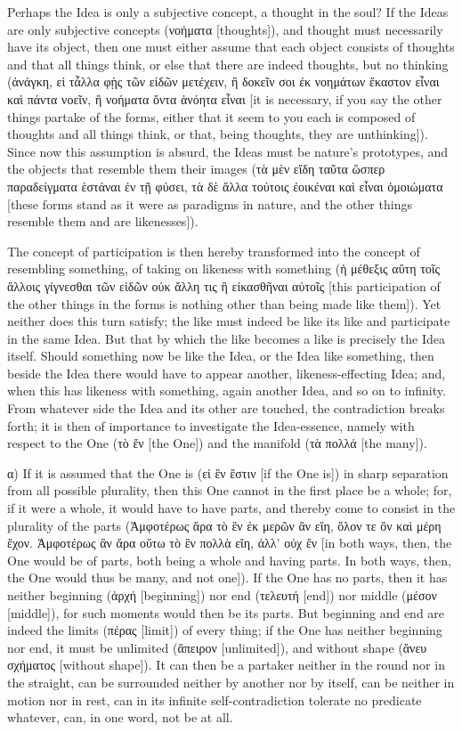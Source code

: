 \documentclass[12pt]{book}
\begin{document}
Perhaps the Idea is only a subjective concept, a thought in the soul? If the Ideas are only
subjective concepts (νοήματα [thoughts]), and thought must necessarily have its object, then one
must either assume that each object consists of thoughts and that all things think, or else that
there are indeed thoughts, but no thinking (ἀνάγκη, εἰ τἆλλα φῂς τῶν εἰδῶν μετέχειν, ἢ δοκεῖν σοι ἐκ
νοημάτων ἕκαστον εἶναι καὶ πάντα νοεῖν, ἢ νοήματα ὄντα ἀνόητα εἶναι [it is necessary, if you say the
other things partake of the forms, either that it seem to you each is composed of thoughts and all
things think, or that, being thoughts, they are unthinking]). Since now this assumption is absurd,
the Ideas must be nature's prototypes, and the objects that resemble them their images (τὰ μὲν εἴδη
ταῦτα ὥσπερ παραδείγματα ἑστάναι ἐν τῇ φύσει, τὰ δὲ ἄλλα τούτοις ἐοικέναι καὶ εἶναι ὁμοιώματα [these
forms stand as it were as paradigms in nature, and the other things resemble them and are
likenesses]).

The concept of participation is then hereby transformed into the concept of resembling something,
of taking on likeness with something (ἡ μέθεξις αὕτη τοῖς ἄλλοις γίγνεσθαι τῶν εἰδῶν οὐκ ἄλλη τις ἢ
εἰκασθῆναι αὐτοῖς [this participation of the other things in the forms is nothing other than being
made like them]). Yet neither does this turn satisfy; the like must indeed be like its like and
participate in the same Idea. But that by which the like becomes a like is precisely the Idea
itself. Should something now be like the Idea, or the Idea like something, then beside the Idea
there would have to appear another, likeness-effecting Idea; and, when this has likeness with
something, again another Idea, and so on to infinity. From whatever side the Idea and its other are
touched, the contradiction breaks forth; it is then of importance to investigate the Idea-essence,
namely with respect to the One (τὸ ἕν [the One]) and the manifold (τὰ πολλά [the many]).

α) If it is assumed that the One is (εἰ ἓν ἔστιν [if the One is]) in sharp separation from all
possible plurality, then this One cannot in the first place be a whole; for, if it were a whole, it
would have to have parts, and thereby come to consist in the plurality of the parts (Ἀμφοτέρως ἄρα
τὸ ἓν ἐκ μερῶν ἂν εἴη, ὅλον τε ὂν καὶ μέρη ἔχον. Ἀμφοτέρως ἂν ἄρα οὕτω τὸ ἓν πολλὰ εἴη, ἀλλ' οὐχ ἕν
[in both ways, then, the One would be of parts, both being a whole and having parts. In both ways,
then, the One would thus be many, and not one]). If the One has no parts, then it has
neither beginning (ἀρχή [beginning]) nor end (τελευτή [end]) nor middle (μέσον [middle]), for such
moments would then be its parts. But beginning and end are indeed the limits (πέρας [limit]) of
every thing; if the One has neither beginning nor end, it must be unlimited (ἄπειρον [unlimited]),
and without shape (ἄνευ σχήματος [without shape]). It can then be a partaker neither in the round
nor in the straight, can be surrounded neither by another nor by itself, can be neither in motion
nor in rest, can in its infinite self-contradiction tolerate no predicate whatever, can, in one
word, not be at all.
\end{document}
